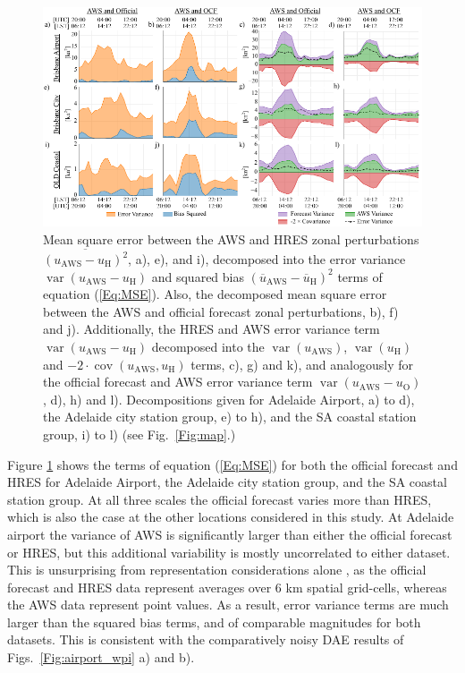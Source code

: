 \documentclass[twocol]{ametsoc}
\DeclareMathOperator{\cov}{cov}
\DeclareMathOperator{\var}{var}
\begin{document}
\begin{figure}
\centering
\includegraphics[width=39pc]{error_decomp_sa.pdf}
\caption{Mean square error between the AWS and HRES zonal perturbations $\overline{\left(u_\text{AWS} - u_\text{H}\right)^2}$, a), e), and i), decomposed into the error variance $\var\left(u_\text{AWS} - u_\text{H}\right)$ and squared bias $\left(\overline{u}_\text{AWS} - \overline{u}_\text{H}\right)^2$ terms of equation (\ref{Eq:MSE}). Also, the decomposed mean square error between the AWS and official forecast zonal perturbations, b), f) and j). Additionally, the HRES and AWS error variance term $\var\left(u_\text{AWS} - u_\text{H}\right)$ decomposed into the $\var\left(u_\text{AWS}\right)$, $\var\left(u_\text{H}\right)$ and  $- 2 \cdot \cov\left(u_\text{AWS}, u_\text{H}\right)$ terms, c), g) and k), and analogously for the official forecast and AWS error variance term $\var\left(u_\text{AWS} - u_\text{O}\right)$, d), h) and l). Decompositions given for Adelaide Airport, a) to d), the Adelaide city station group, e) to h), and the SA coastal station group, i) to l) (see Fig.~\ref{Fig:map}.)}
\label{Fig:error_decomp_sa}
\end{figure}

Figure \ref{Fig:error_decomp_sa} shows the terms of equation (\ref{Eq:MSE}) for both the official forecast and HRES for Adelaide Airport, the Adelaide city station group, and the SA coastal station group.  At all three scales the official forecast varies more than HRES, which is also the case at the other locations considered in this study. At Adelaide airport the variance of AWS is significantly larger than either the official forecast or HRES, but this additional variability is mostly uncorrelated to either dataset. This is unsurprising from representation considerations alone \citep[e.g.][]{zaron06}, as the official forecast and HRES data represent averages over 6 km spatial grid-cells, whereas the AWS data represent point values. As a result, error variance terms are much larger than the squared bias terms, and of comparable magnitudes for both datasets. This is consistent with the comparatively noisy DAE results of Figs.~\ref{Fig:airport_wpi} a) and b). 
\end{document}
